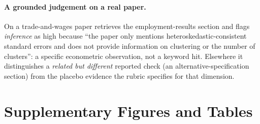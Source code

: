 \begin{table}[t]
  \centering\small
  \caption{\sys{} audit report (abridged) on the fixture with the injected
  anticipation flaw. Rationales are abridged from the evidence-cited report; the injected
  dimension is the one flagged high.}
  \label{tab:casestudy}
  \setlength{\tabcolsep}{4pt}
\end{table}

\paragraph{A grounded judgement on a real paper.}
On a trade-and-wages paper \sys{} retrieves the employment-results section and
flags \emph{inference} as high because ``the paper only mentions
heteroskedastic-consistent standard errors and does not provide information on
clustering or the number of clusters'': a specific econometric observation, not
a keyword hit. Elsewhere it distinguishes a \emph{related but different} reported
check (an alternative-specification section) from the placebo evidence the
rubric specifies for that dimension.

\section{Supplementary Figures and Tables}
\label{app:supp}

